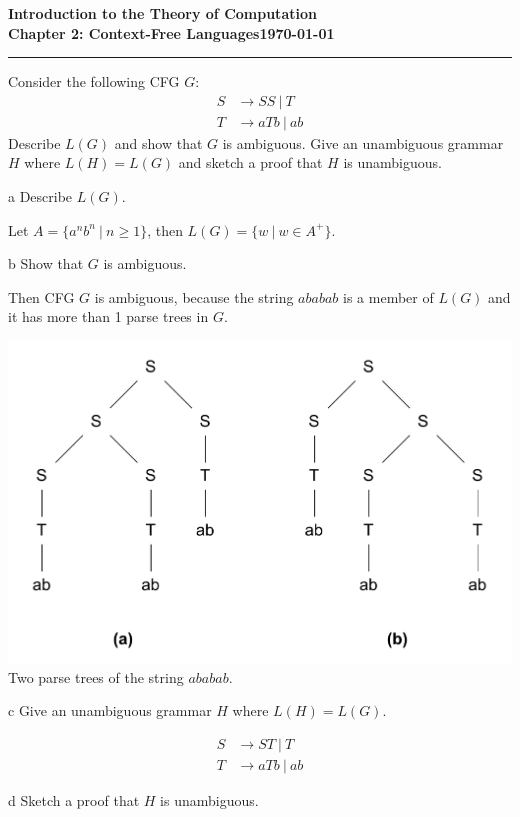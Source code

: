\documentclass[11pt]{article}
\newcommand{\dated}{\today}
\begin{document}
\textbf{Introduction to the Theory of
Computation}\hfill\textbf{\myname}\\[0.01in]
\textbf{Chapter 2: Context-Free Languages}\hfill\textbf{\dated}\\
\smallskip\hrule\bigskip

\begin{problem}{2.46}
Consider the following CFG $G$:
\begin{align*}
S &\rightarrow SS \ | \ T \\
T &\rightarrow aTb \ | \ ab
\end{align*}
Describe $L(G)$ and show that $G$ is ambiguous. Give an unambiguous grammar $H$ where $L(H) = L(G)$ and sketch a proof that $H$ is unambiguous.
\end{problem}

\begin{problem}[Part]{a}
Describe $L(G)$.
\end{problem}

Let $A = \{a^nb^n \ | \ n \geq 1\}$, then $L(G) = \{w \ | \ w \in A^+\}$.

\begin{problem}[Part]{b}
Show that $G$ is ambiguous.
\end{problem}

Then CFG $G$ is ambiguous, because the string $ababab$ is a member of $L(G)$ and it has more than 1 parse trees in $G$.

\begin{center}
\includegraphics[scale=0.8]{Figures/Problem2.46a.pdf} \\
Two parse trees of the string $ababab$.
\end{center}

\begin{problem}[Part]{c}
Give an unambiguous grammar $H$ where $L(H) = L(G)$.
\end{problem}
\begin{align*}
S &\rightarrow ST \ | \ T \\
T &\rightarrow aTb \ | \ ab
\end{align*}

\begin{problem}[Part]{d}
Sketch a proof that $H$ is unambiguous.
\end{problem}
\end{document}
